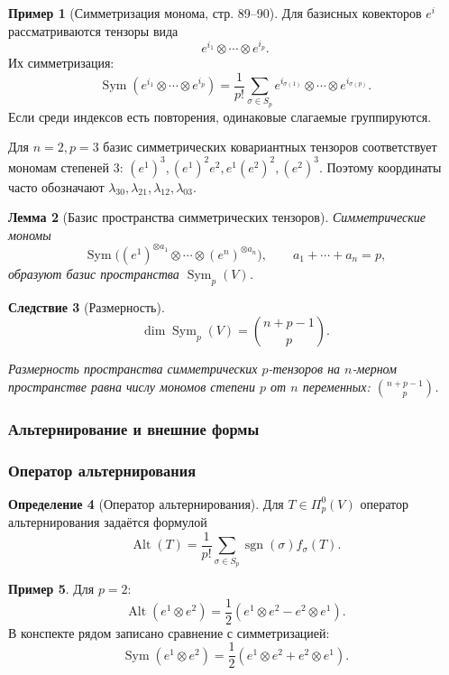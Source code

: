 \documentclass[12pt,a4paper]{article}
\theoremstyle{definition}
\newtheorem{definition}{Определение}[section]
\newtheorem{example}[definition]{Пример}
\theoremstyle{plain}
\newtheorem{lemma}[definition]{Лемма}
\newtheorem{corollary}[definition]{Следствие}
\theoremstyle{remark}
\newenvironment{knowledgefix}{\begin{clarifybox}}{\end{clarifybox}}
\newcommand{\Sym}{\operatorname{Sym}}
\newcommand{\Alt}{\operatorname{Alt}}
\providecommand{\sgn}{\operatorname{sgn}}
\begin{document}
\begin{example}[Симметризация монома, стр. 89--90]
Для базисных ковекторов $e^i$ рассматриваются тензоры вида
\[
    e^{i_1}\otimes\cdots\otimes e^{i_p}.
\]
Их симметризация:
\[
    \Sym(e^{i_1}\otimes\cdots\otimes e^{i_p})
    =
    \frac{1}{p!}\sum_{\sigma\in S_p}
    e^{i_{\sigma(1)}}\otimes\cdots\otimes e^{i_{\sigma(p)}}.
\]
Если среди индексов есть повторения, одинаковые слагаемые группируются.
\begin{knowledgefix}
Для \(n=2,p=3\) базис симметрических ковариантных тензоров соответствует мономам степеней \(3\): \((e^1)^3,(e^1)^2e^2,e^1(e^2)^2,(e^2)^3\). Поэтому координаты часто обозначают \(\lambda_{30},\lambda_{21},\lambda_{12},\lambda_{03}\).
\end{knowledgefix}
\end{example}

\begin{lemma}[Базис пространства симметрических тензоров]
Симметрические мономы
\[
    \Sym\bigl((e^1)^{\otimes a_1}\otimes\cdots\otimes(e^n)^{\otimes a_n}\bigr),
    \qquad
    a_1+\cdots+a_n=p,
\]
образуют базис пространства $\Sym_p(V)$.
\end{lemma}

\begin{corollary}[Размерность]
\[
    \dim \Sym_p(V)=\binom{n+p-1}{p}.
\]
\begin{knowledgefix}
Размерность пространства симметрических \(p\)-тензоров на \(n\)-мерном пространстве равна числу мономов степени \(p\) от \(n\) переменных: \(\binom{n+p-1}{p}\).
\end{knowledgefix}
\end{corollary}

\subsubsection{Альтернирование и внешние формы}

\subsubsection*{Оператор альтернирования}

\begin{definition}[Оператор альтернирования]
Для $T\in\Pi^0_p(V)$ оператор альтернирования задаётся формулой
\[
    \Alt(T)=\frac{1}{p!}\sum_{\sigma\in S_p}\sgn(\sigma)f_\sigma(T).
\]
\end{definition}

\begin{example}
Для $p=2$:
\[
    \Alt(e^1\otimes e^2)
    =
    \frac{1}{2}(e^1\otimes e^2-e^2\otimes e^1).
\]
В конспекте рядом записано сравнение с симметризацией:
\[
    \Sym(e^1\otimes e^2)
    =
    \frac{1}{2}(e^1\otimes e^2+e^2\otimes e^1).
\]
\end{example}
\end{document}
